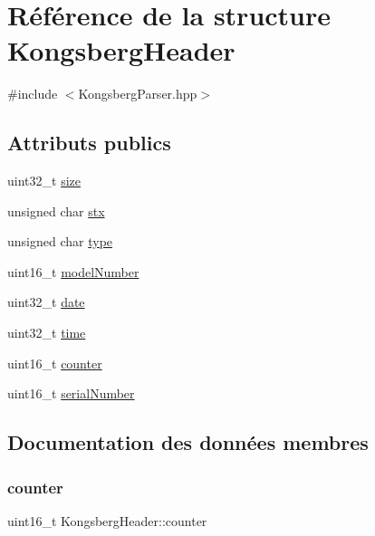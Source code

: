 \hypertarget{structKongsbergHeader}{}\section{Référence de la structure Kongsberg\+Header}
\label{structKongsbergHeader}


{\ttfamily \#include $<$Kongsberg\+Parser.\+hpp$>$}

\subsection*{Attributs publics}
\begin{DoxyCompactItemize}
\item 
uint32\+\_\+t \hyperlink{structKongsbergHeader_a15e4621707e24d4904395d3a1e26a9fe}{size}
\item 
unsigned char \hyperlink{structKongsbergHeader_a919858cc5e98d8f3182091ea2fba2531}{stx}
\item 
unsigned char \hyperlink{structKongsbergHeader_a53429e4241d2b6f9163ece6ff6eae4d3}{type}
\item 
uint16\+\_\+t \hyperlink{structKongsbergHeader_a6ec045b8677927f8c7bfa7b71481e424}{model\+Number}
\item 
uint32\+\_\+t \hyperlink{structKongsbergHeader_a43b7d1f638a2264ee629faf5ff920326}{date}
\item 
uint32\+\_\+t \hyperlink{structKongsbergHeader_aa9701e6d9deaf91ce47631221b50ec6c}{time}
\item 
uint16\+\_\+t \hyperlink{structKongsbergHeader_a15fc213f2eecb5a01c9d042ea57fcdd7}{counter}
\item 
uint16\+\_\+t \hyperlink{structKongsbergHeader_afd878130f79841cefe289aeceb79f970}{serial\+Number}
\end{DoxyCompactItemize}


\subsection{Documentation des données membres}
\mbox{\label{structKongsbergHeader_a15fc213f2eecb5a01c9d042ea57fcdd7}} 
\subsubsection{\texorpdfstring{counter}{counter}}
{\footnotesize\ttfamily uint16\+\_\+t Kongsberg\+Header\+::counter}

